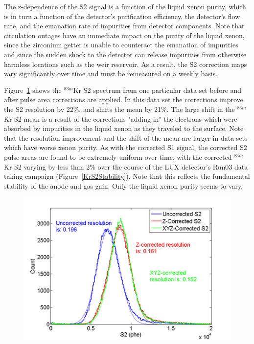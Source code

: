 The z-dependence of the S2 signal is a function of the liquid xenon purity, which is in turn a function of the detector's purification efficiency, the detector's flow rate, and the emanation rate of impurities from detector components.  Note that circulation outages have an immediate impact on the purity of the liquid xenon, since the zirconium getter is unable to counteract the emanation of impurities and since the sudden shock to the detector can release impurities from otherwise harmless locations such as the weir reservoir.  As a result, the S2 correction maps vary significantly over time and must be remeasured on a weekly basis.



\newpage

Figure~\ref{KrS2Improvement} shows the $^{83m}$Kr S2 spectrum from one particular data set before and after pulse area corrections are applied. In this data set the corrections improve the S2 resolution by 22\%, and shifts the mean by 21\%.  The large shift in the $^{83m}$Kr S2 mean is a result of the corrections "adding in" the electrons which were absorbed by impurities in the liquid xenon as they traveled to the surface.  Note that the resolution improvement and the shift of the mean are larger in data sets which have worse xenon purity.  As with the corrected S1 signal, the corrected S2 pulse areas are found to be extremely uniform over time, with the corrected $^{83m}$Kr S2 varying by less than 2\% over the course of the LUX detector's Run03 data taking campaign (Figure~\ref{KrS2Stability}).  Note that this reflects the fundamental stability of the anode and gas gain.  Only the liquid xenon purity seems to vary.

\begin{figure} [!h]
\includegraphics[scale=.7]{KRS2_ResolutionImprovement.png} 
\label{KrS2Improvement}
\end{figure}

